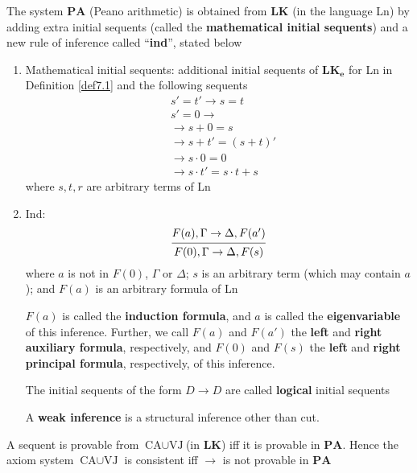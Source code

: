 \documentclass[11pt]{article}
\def \LK {\textbf{LK}}
\def \LKe {\textbf{LK}_\textbf{e}}
\def \CA {\text{CA}}
\def \VJ {\text{VJ}}
\def \PA {\textbf{PA}}
\begin{document}
\begin{definition}[]
The system \(\PA\) (Peano arithmetic) is obtained from \(\LK\) (in the language Ln) by adding
extra initial sequents (called the \textbf{mathematical initial sequents}) and a new rule of inference
called ``\textbf{ind}'', stated below
\begin{enumerate}
\item Mathematical initial sequents: additional initial sequents of \(\LKe\) for Ln in Definition
\ref{def7.1} and the following sequents
\begin{align*}
&s'=t' \to s=t\\
&s'=0 \to \\
& \to s+0 = s\\
& \to s+t'=(s+t)'\\
& \to s\cdot 0=0\\
& \to s\cdot t'=s\cdot t+s
\end{align*}
where \(s,t,r\) are arbitrary terms of Ln
\item Ind:
\begin{equation*}
\begin{prooftree}%
\hypo{F(a),\Gamma\to\Delta,F(a')}
\infer1{F(0),\Gamma\to\Delta,F(s)}
\end{prooftree}
\end{equation*}
where \(a\) is not in \(F(0)\), \(\Gamma\) or \(\Delta\); \(s\) is an arbitrary term (which may contain \(a\));
and \(F(a)\) is an arbitrary formula of Ln

\(F(a)\) is called the \textbf{induction formula}, and \(a\) is called the \textbf{eigenvariable} of this
inference. Further, we call \(F(a)\) and \(F(a')\) the \textbf{left} and \textbf{right auxiliary formula},
respectively, and \(F(0)\) and \(F(s)\) the \textbf{left} and \textbf{right principal formula}, respectively, of
this inference.

The initial sequents of the form \(D\to D\) are called \textbf{logical} initial sequents

A \textbf{weak inference} is a structural inference other than cut.
\end{enumerate}
\end{definition}

\begin{proposition}[]
A sequent is provable from \(\CA\cup\VJ\)(in \(\LK\)) iff it is provable in \(\PA\). Hence the
axiom system \(\CA\cup\VJ\) is consistent iff \(\to\) is not provable in \(\PA\)
\end{proposition}
\end{document}
